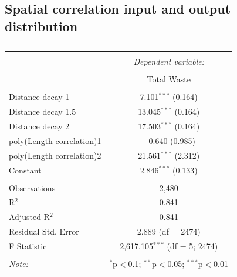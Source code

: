 \documentclass[fleqn,10pt]{wlscirep}
\begin{document}
{\subsection*{Spatial correlation input and output distribution}
\begin{table}[!htbp] \centering 
  \caption{} 
  \label{} 
\begin{tabular}{@{\extracolsep{5pt}}lc} 
\\[-1.8ex]\hline 
\hline \\[-1.8ex] 
 & \multicolumn{1}{c}{\textit{Dependent variable:}} \\ 
\cline{2-2} 
\\[-1.8ex] & Total Waste \\ 
\hline \\[-1.8ex] 
 Distance decay 1 & 7.101$^{***}$ (0.164) \\ 
 Distance decay 1.5 & 13.045$^{***}$ (0.164) \\ 
 Distance decay 2 & 17.503$^{***}$ (0.164) \\ 
 poly(Length correlation)1 & $-$0.640 (0.985) \\ 
 poly(Length correlation)2 & 21.561$^{***}$ (2.312) \\ 
 Constant & 2.846$^{***}$ (0.133) \\ 
\hline \\[-1.8ex] 
Observations & 2,480 \\ 
R$^{2}$ & 0.841 \\ 
Adjusted R$^{2}$ & 0.841 \\ 
Residual Std. Error & 2.889 (df = 2474) \\ 
F Statistic & 2,617.105$^{***}$ (df = 5; 2474) \\ 
\hline 
\hline \\[-1.8ex] 
\textit{Note:}  & \multicolumn{1}{r}{$^{*}$p$<$0.1; $^{**}$p$<$0.05; $^{***}$p$<$0.01} \\ 
\end{tabular} 
\end{table} 


}
\end{document}
